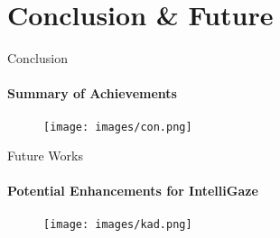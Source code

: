 \documentclass[10pt]{beamer}
\begin{document}
\section{Conclusion \& Future}

\begin{frame}{Conclusion}
    \framesubtitle{Summary of Achievements}
    \begin{figure}
        \centering
        \texttt{[image: images/con.png]}
    \end{figure}
\end{frame}

\begin{frame}{Future Works}
    \framesubtitle{Potential Enhancements for IntelliGaze}
    \begin{figure}
        \centering
        \texttt{[image: images/kad.png]}
    \end{figure}
\end{frame}

\end{document}
